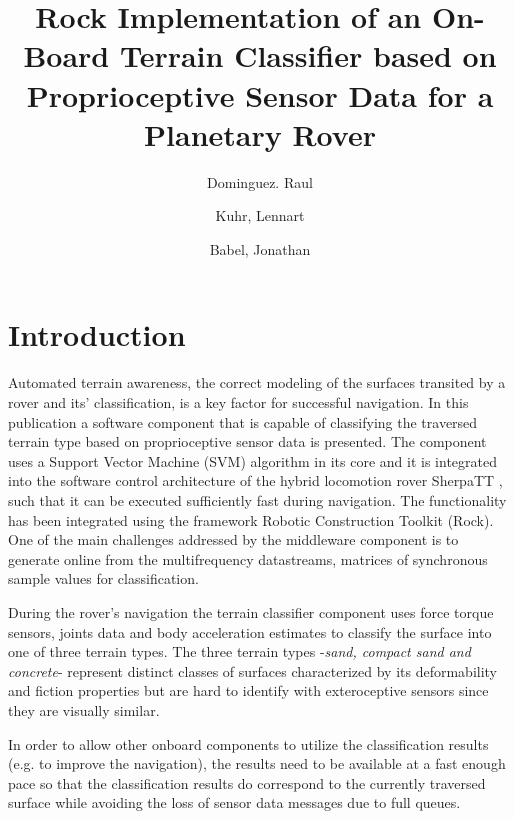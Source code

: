 \documentclass{article}
\title{Rock Implementation of an On-Board Terrain Classifier based on Proprioceptive Sensor Data for a Planetary Rover}
\author{
Dominguez. Raul \and Kuhr, Lennart \and Babel, Jonathan
}
\begin{document}
\maketitle



\section{Introduction}



Automated terrain awareness, the correct modeling of the surfaces transited by a rover and its’ classification, is a key factor for successful navigation. 
In this publication a software component that is capable of classifying the traversed terrain type based on proprioceptive sensor data is presented. 
The component uses a Support Vector Machine (SVM) algorithm \cite{vapnik1992,cristianini2000} in its core and it is integrated into the software control architecture of the hybrid locomotion rover SherpaTT \cite{cordes2018}, such that it can be executed sufficiently fast during navigation. 
The functionality has been integrated using the framework Robotic Construction Toolkit (Rock).
One of the main challenges addressed by the middleware component is to generate online from the multifrequency datastreams, matrices of synchronous sample values for classification.

During the rover's navigation the terrain classifier component uses force torque sensors, joints data and body acceleration estimates to classify the surface into one of three terrain types.
The three terrain types -\emph{sand, compact sand and concrete}- represent distinct classes of surfaces characterized by its deformability and fiction properties but are hard to identify with exteroceptive sensors since they are visually similar.

In order to allow other onboard components to utilize the classification results (e.g. to improve the navigation), the results need to be available at a fast enough pace so that the classification results do correspond to the currently traversed surface while avoiding the loss of sensor data messages due to full queues.
\end{document}
